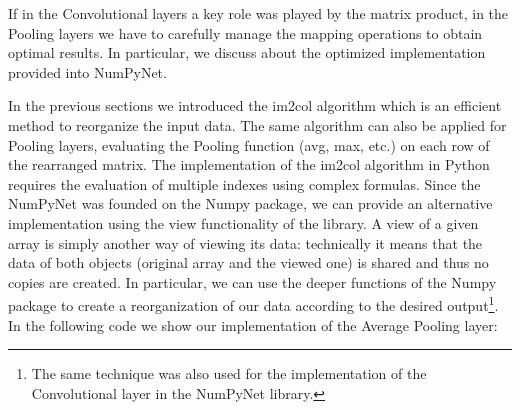 \documentclass{standalone}
\begin{document}
If in the Convolutional layers a key role was played by the matrix product, in the Pooling layers we have to carefully manage the mapping operations to obtain optimal results.
In particular, we discuss about the optimized implementation provided into \textsf{NumPyNet}.

In the previous sections we introduced the \textsf{im2col} algorithm which is an efficient method to reorganize the input data.
The same algorithm can also be applied for Pooling layers, evaluating the Pooling function (avg, max, etc.) on each row of the rearranged matrix.
The implementation of the \textsf{im2col} algorithm in \textsf{Python} requires the evaluation of multiple indexes using complex formulas.
Since the \textsf{NumPyNet} was founded on the \textsf{Numpy} package, we can provide an alternative implementation using the \textsf{view} functionality of the library.
A \textsf{view} of a given array is simply another way of viewing its data: technically it means that the data of both objects (original array and the viewed one) is shared and thus no copies are created.
In particular, we can use the deeper functions of the \textsf{Numpy} package to create a reorganization of our data according to the desired output\footnote{
  The same technique was also used for the implementation of the Convolutional layer in the \textsf{NumPyNet} library.
}.
In the following code we show our implementation of the Average Pooling layer:
\end{document}
